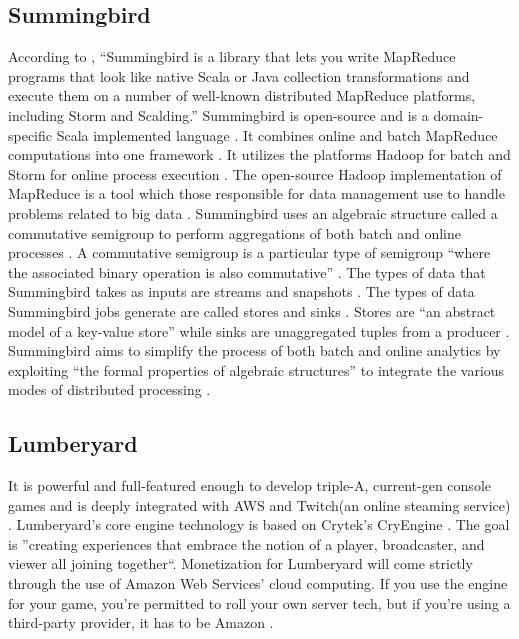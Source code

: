      
\subsection{Summingbird}
     
     According to \cite{summingbirdgit}, ``Summingbird is
     a library that lets you write MapReduce programs that look like
     native Scala or Java collection transformations and execute them
     on a number of well-known distributed MapReduce platforms,
     including Storm and Scalding.''  Summingbird is open-source and is
     a domain-specific Scala implemented language
     \cite{boykin2014summingbird}. It combines online and batch
     MapReduce computations into one framework
     \cite{boykin2014summingbird}. It utilizes the platforms Hadoop
     for batch and Storm for online process execution
     \cite{boykin2014summingbird}. The open-source Hadoop
     implementation of MapReduce is a tool which those responsible for
     data management use to handle problems related to big data
     \cite{boykin2014summingbird}. Summingbird uses an algebraic
     structure called a commutative semigroup to perform aggregations
     of both batch and online processes
     \cite{boykin2014summingbird}. A commutative semigroup is a
     particular type of semigroup ``where the associated binary
     operation is also commutative'' \cite{boykin2014summingbird}.
     The types of data that Summingbird takes as inputs are streams
     and snapshots \cite{boykin2014summingbird}. The types of data
     Summingbird jobs generate are called stores and sinks
     \cite{boykin2014summingbird}. Stores are ``an abstract model of a
     key-value store'' while sinks are unaggregated tuples from a
     producer \cite{boykin2014summingbird}. Summingbird aims to
     simplify the process of both batch and online analytics by
     exploiting ``the formal properties of algebraic structures'' to
     integrate the various modes of distributed processing
     \cite{boykin2014summingbird}.
	   
\subsection{Lumberyard}
     
     It is powerful and full-featured enough to develop triple-A,
     current-gen console games and is deeply integrated with AWS and
     Twitch(an online steaming service)
     \cite{gamasutra}. Lumberyard's core engine technology is based
     on Crytek's CryEngine \cite{hands}. The goal is ''creating
     experiences that embrace the notion of a player, broadcaster, and
     viewer all joining together``\cite{gamasutra}. Monetization for
     Lumberyard will come strictly through the use of Amazon Web
     Services' cloud computing. If you use the engine for your game,
     you're permitted to roll your own server tech, but if you're
     using a third-party provider, it has to be Amazon \cite{what}.

